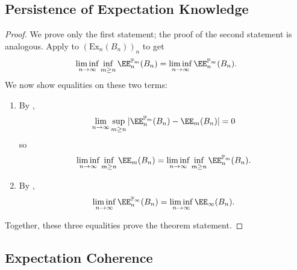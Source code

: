 \documentclass[authordate,onecolumn,noenvironments]{miri-tech-article}
\numberwithin{equation}{subsection}
\newcommand{\mm}{m}
\newcommand{\nn}{n}
\newcommand{\affluv}{B} %
\newcommand{\alta}{\mathrm{Ex}} %
\newcommand{\BelState}{\mathbb{P}}
\newcommand{\pt}{\BelState}
\begin{document}
\subsection{Persistence of Expectation Knowledge}\label{app:perexpkno}

\perexpkno*

\begin{proof}
  We prove only the first statement; the proof of the second statement is analogous.  Apply  to $(\alta_n(\affluv_\nn))_n$ to get
  \[
    \liminf_{\nn\rightarrow\infty}\inf_{\mm\geq \nn}\EE_n^{\pt_\mm}(\affluv_\nn )= \liminf_{\nn\to\infty}\EE_n^{\pt_\infty}(\affluv_\nn ).
  \]
  We now show equalities on these two terms:
  \begin{enumerate}
    \item
  By ,
  \[
    \lim_{\nn\rightarrow\infty}\sup_{\mm\geq \nn}|\EE_n^{\pt_\mm}(\affluv_\nn ) - \EE_m(\affluv_n)| = 0
  \]
  so
  \[ 
    \liminf_{\nn\rightarrow\infty}\inf_{\mm\geq \nn}\EE_m(\affluv_\nn )= 
    \liminf_{\nn\rightarrow\infty}\inf_{\mm\geq \nn}\EE_n^{\pt_\mm}(\affluv_\nn ).
  \]
\item
  By ,
  \[
    \liminf_{\nn\to\infty}\EE_n^{\pt_\infty}(\affluv_\nn ) = \liminf_{n \to \infty} \EE_\infty(\affluv_n).
  \]
  \end{enumerate}
  Together, these three equalities prove the theorem statement.
\end{proof}

\subsection{Expectation Coherence}\label{app:expcoh}

\expcoh*
\end{document}
